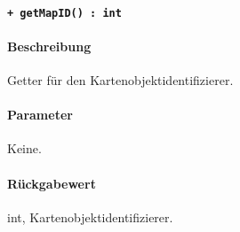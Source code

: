\paragraph{\texttt{+ getMapID() : int}}\label{AP_Alias_getMapID}%
\paragraph*{Beschreibung}
Getter für den Kartenobjektidentifizierer.
\paragraph*{Parameter}
Keine.
\paragraph*{Rückgabewert}
int, Kartenobjektidentifizierer.